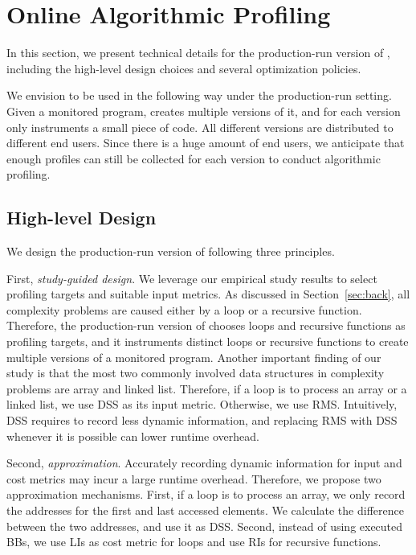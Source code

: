 \section{Online Algorithmic Profiling}
\label{sec:online}

In this section, we present technical details 
for the production-run version of \Tool, 
including the high-level design choices
and several optimization policies. 

We envision \Tool to be used in the following way 
under the production-run setting.
Given a monitored program, \Tool creates multiple versions of it, 
and for each version \Tool only instruments a small piece of code. 
All different versions are distributed to different end users. 
Since there is a huge amount of end users, 
we anticipate that enough profiles can still be collected 
for each version 
to conduct algorithmic profiling. 
 
\subsection{High-level Design}
\label{sec:high}

We design the production-run version 
of \Tool following three principles. 

First, \textit{study-guided design}.
We leverage our empirical study results 
to select profiling targets and suitable input metrics.
As discussed in Section~\ref{sec:back}, 
all complexity problems are 
caused either by a loop or a recursive function. 
Therefore, the production-run version of \Tool chooses loops 
and recursive functions as profiling targets, 
and it instruments distinct loops or recursive functions to create multiple
versions of a monitored program. 
Another important finding of our study
is that the most two commonly involved 
data structures in complexity problems 
are array and linked list.
Therefore, if a loop is to process an array 
or a linked list, we use DSS as its input metric.
Otherwise, we use RMS. 
Intuitively, DSS requires to record less dynamic information, 
and replacing RMS with DSS whenever it is possible 
can lower runtime overhead. 

Second, \textit{approximation}.
Accurately recording dynamic information for input and cost metrics
may incur a large runtime overhead.
Therefore, we propose two approximation mechanisms. 
First, if a loop is to process an array, 
we only record the addresses for the first 
and last accessed elements.
We calculate the difference between the two addresses, 
and use it as DSS.
Second, instead of using executed BBs, 
we use LIs as cost metric for loops 
and use RIs for recursive functions. 


